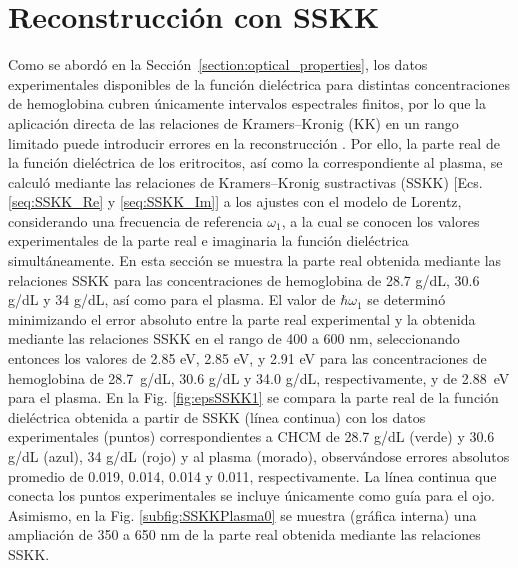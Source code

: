 

\chapter{Reconstrucción con SSKK}

\label{section:apendix2}

Como se abordó en la Sección~\ref{section:optical_properties}, los datos experimentales disponibles de la función dieléctrica para distintas concentraciones de hemoglobina cubren únicamente intervalos espectrales finitos, por lo que la aplicación directa de las relaciones de Kramers–Kronig (KK) en un rango limitado puede introducir errores en la reconstrucción \cite{miltonFiniteFrequencyRange1997}. Por ello, la parte real de la función dieléctrica de los eritrocitos, así como la correspondiente al plasma, se calculó mediante %
%
las relaciones de Kramers–Kronig sustractivas (SSKK) [Ecs. \ref{seq:SSKK_Re} y \ref{seq:SSKK_Im}] a los ajustes con el modelo de Lorentz, considerando una frecuencia de referencia $\omega_1$, a la cual se conocen los valores experimentales de la  parte real e imaginaria la función dieléctrica simultáneamente. En esta sección se muestra la parte real obtenida mediante las relaciones SSKK para las concentraciones de hemoglobina de 28.7 g/dL, 30.6 g/dL y 34 g/dL, así como para el plasma. El valor de $\hbar\omega_1$ se determinó minimizando el error absoluto entre la parte real experimental y la obtenida mediante las relaciones SSKK en el rango de 400 a 600 nm, seleccionando entonces los valores de 2.85 eV, 2.85 eV, y 2.91 eV para las concentraciones de hemoglobina de 28.7~g/dL, 30.6 g/dL y 34.0 g/dL, respectivamente, y de 2.88~eV para el plasma. En la Fig. \ref{fig:epsSSKK1} se compara la parte real de la función dieléctrica obtenida a partir de SSKK (línea continua) con los datos experimentales (puntos) correspondientes a CHCM de 28.7 g/dL (verde) y 30.6 g/dL (azul), 34 g/dL (rojo) y al plasma (morado), observándose errores absolutos promedio de 0.019, 0.014, 0.014 y 0.011, respectivamente. La línea continua que conecta los puntos experimentales se incluye únicamente como guía para el ojo. Asimismo, en la Fig. \ref{subfig:SSKKPlasma0} se muestra (gráfica interna) una ampliación de 350 a 650 nm de la parte real obtenida mediante las relaciones SSKK.
%

